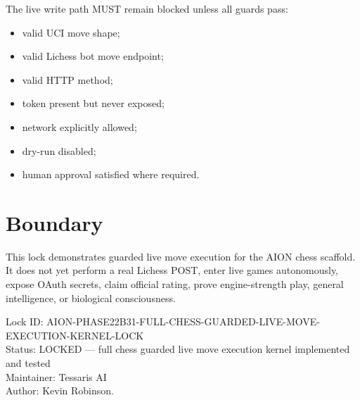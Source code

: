 \documentclass[11pt,a4paper]{article}
\begin{document}
The live write path MUST remain blocked unless all guards pass:

\begin{itemize}
  \item valid UCI move shape;
  \item valid Lichess bot move endpoint;
  \item valid HTTP method;
  \item token present but never exposed;
  \item network explicitly allowed;
  \item dry-run disabled;
  \item human approval satisfied where required.
\end{itemize}

\section{Boundary}

This lock demonstrates guarded live move execution for the AION chess scaffold. It does not yet perform a real Lichess POST, enter live games autonomously, expose OAuth secrets, claim official rating, prove engine-strength play, general intelligence, or biological consciousness.

\bigskip

\noindent
Lock ID: AION-PHASE22B31-FULL-CHESS-GUARDED-LIVE-MOVE-EXECUTION-KERNEL-LOCK\\
Status: LOCKED --- full chess guarded live move execution kernel implemented and tested\\
Maintainer: Tessaris AI\\
Author: Kevin Robinson.
\end{document}
